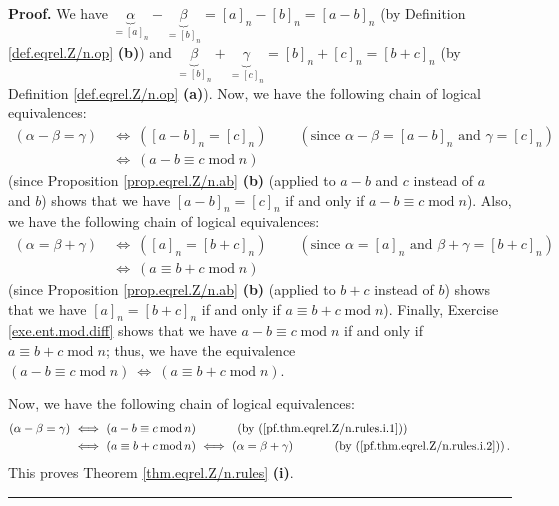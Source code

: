 \documentclass[numbers=enddot,12pt,final,onecolumn,notitlepage]{scrartcl}%
\numberwithin{exer}{subsection}
\theoremstyle{definition}
\newenvironment{proof}[1][Proof]{\noindent\textbf{#1.} }{\ \rule{0.5em}{0.5em}}
\begin{document}
\begin{proof}
We have $\underbrace{\alpha}_{=\left[  a\right]  _{n}}-\underbrace{\beta
}_{=\left[  b\right]  _{n}}=\left[  a\right]  _{n}-\left[  b\right]
_{n}=\left[  a-b\right]  _{n}$ (by Definition \ref{def.eqrel.Z/n.op}
\textbf{(b)}) and $\underbrace{\beta}_{=\left[  b\right]  _{n}}%
+\underbrace{\gamma}_{=\left[  c\right]  _{n}}=\left[  b\right]  _{n}+\left[
c\right]  _{n}=\left[  b+c\right]  _{n}$ (by Definition \ref{def.eqrel.Z/n.op}
\textbf{(a)}). Now, we have the following chain of logical equivalences:%
\begin{align}
\left(  \alpha-\beta=\gamma\right)  \  &  \Longleftrightarrow\ \left(  \left[
a-b\right]  _{n}=\left[  c\right]  _{n}\right)  \ \ \ \ \ \ \ \ \ \ \left(
\text{since }\alpha-\beta=\left[  a-b\right]  _{n}\text{ and }\gamma=\left[
c\right]  _{n}\right) \nonumber\\
&  \Longleftrightarrow\ \left(  a-b\equiv c\operatorname{mod}n\right)
\label{pf.thm.eqrel.Z/n.rules.i.1}%
\end{align}
(since Proposition \ref{prop.eqrel.Z/n.ab} \textbf{(b)} (applied to $a-b$ and
$c$ instead of $a$ and $b$) shows that we have $\left[  a-b\right]
_{n}=\left[  c\right]  _{n}$ if and only if $a-b\equiv c\operatorname{mod}n$).
Also, we have the following chain of logical equivalences:%
\begin{align}
\left(  \alpha=\beta+\gamma\right)  \  &  \Longleftrightarrow\ \left(  \left[
a\right]  _{n}=\left[  b+c\right]  _{n}\right)  \ \ \ \ \ \ \ \ \ \ \left(
\text{since }\alpha=\left[  a\right]  _{n}\text{ and }\beta+\gamma=\left[
b+c\right]  _{n}\right) \nonumber\\
&  \Longleftrightarrow\ \left(  a\equiv b+c\operatorname{mod}n\right)
\label{pf.thm.eqrel.Z/n.rules.i.2}%
\end{align}
(since Proposition \ref{prop.eqrel.Z/n.ab} \textbf{(b)} (applied to $b+c$
instead of $b$) shows that we have $\left[  a\right]  _{n}=\left[  b+c\right]
_{n}$ if and only if $a\equiv b+c\operatorname{mod}n$). Finally, Exercise
\ref{exe.ent.mod.diff} shows that we have $a-b\equiv c\operatorname{mod}n$ if
and only if $a\equiv b+c\operatorname{mod}n$; thus, we have the equivalence
$\left(  a-b\equiv c\operatorname{mod}n\right)  \ \Longleftrightarrow\ \left(
a\equiv b+c\operatorname{mod}n\right)  $.

Now, we have the following chain of logical equivalences:%
\begin{align*}
\left(  \alpha-\beta=\gamma\right)  \  &  \Longleftrightarrow\ \left(
a-b\equiv c\operatorname{mod}n\right)  \ \ \ \ \ \ \ \ \ \ \left(  \text{by
(\ref{pf.thm.eqrel.Z/n.rules.i.1})}\right) \\
&  \Longleftrightarrow\ \left(  a\equiv b+c\operatorname{mod}n\right)
\ \Longleftrightarrow\ \left(  \alpha=\beta+\gamma\right)
\ \ \ \ \ \ \ \ \ \ \left(  \text{by (\ref{pf.thm.eqrel.Z/n.rules.i.2}%
)}\right)  .
\end{align*}
This proves Theorem \ref{thm.eqrel.Z/n.rules} \textbf{(i)}.
\end{proof}
\end{document}
